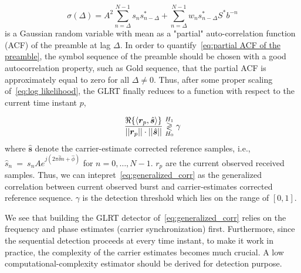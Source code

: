\begin{equation}
    \label{eq:partial ACF of the preamble}
    \sigma(\Delta)=A^2\sum_{n=\Delta}^{N-1}s_ns^*_{n-\Delta}+\sum_{n=\Delta}^{N-1}w_ns^*_{n-\Delta}S^*b^{-n}
\end{equation}
is a Gaussian random variable with mean as a "partial" auto-correlation function (ACF) of the preamble at lag $\Delta$.
In order to quantify~\eqref{eq:partial ACF of the preamble}, the symbol sequence of the preamble should be chosen with a good autocorrelation property,
such as Gold sequence, that the partial ACF is approximately equal to zero for all $\Delta \neq 0$. 
Thus, after some proper scaling of~\eqref{eq:log likelihood}, the GLRT finally reduces to 
a function with respect to the current time instant $p$,

\begin{equation}
    \label{eq:generalized_corr}
    \frac{\Re\{\langle
      \bm{r}_p,\hat{\bm{s}}\rangle\}}
    {||\bm{r}_p||\cdot||\hat{\bm{s}}||} \mathrel{\mathop\gtrless\limits^{H_1}_{H_0}} \gamma
  \end{equation}
where $\hat{\bm{s}}$ denote the carrier-estimate corrected reference samples, i.e., $\hat{s}_{n}~{=}~s_{n}Ae^{j(2\pi\hat{\delta}n+\hat{\phi})}$ for $n=0,\ldots,N{-}1$.
$r_p$ are the current observed received samples.
Thus, we can intepret~\eqref{eq:generalized_corr} as the generalized correlation between current observed burst and carrier-estimates corrected reference sequence.
$\gamma$ is the detection threshold which lies on the range of $[0,1]$.

We see that building the GLRT detector of~\eqref{eq:generalized_corr} relies on the frequency and phase estimates (carrier synchronization) first.
Furthermore, since the sequential detection proceeds at every time instant, to make it work in practice, the complexity of the carrier estimates becomes
much crucial. A low computational-complexity estimator should be derived for detection purpose.

%
% 